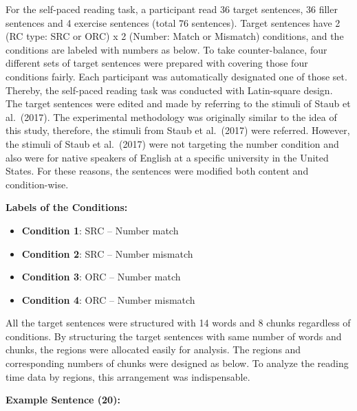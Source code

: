 \documentclass[
]{article}
\begin{document}
For the self-paced reading task, a participant read 36 target sentences,
36 filler sentences and 4 exercise sentences (total 76 sentences).
Target sentences have 2 (RC type: SRC or ORC) x 2 (Number: Match or
Mismatch) conditions, and the conditions are labeled with numbers as
below. To take counter-balance, four different sets of target sentences
were prepared with covering those four conditions fairly. Each
participant was automatically designated one of those set. Thereby, the
self-paced reading task was conducted with Latin-square design. The
target sentences were edited and made by referring to the stimuli of
Staub et al.~(2017). The experimental methodology was originally similar
to the idea of this study, therefore, the stimuli from Staub et
al.~(2017) were referred. However, the stimuli of Staub et al.~(2017)
were not targeting the number condition and also were for native
speakers of English at a specific university in the United States. For
these reasons, the sentences were modified both content and
condition-wise.

\vspace{1em}

\noindent \textbf{Labels of the Conditions:}

\vspace{0.5em}

\begin{itemize}
  \setlength\itemsep{0.5em}
  \item \textbf{Condition 1}: SRC -- Number match
  \item \textbf{Condition 2}: SRC -- Number mismatch
  \item \textbf{Condition 3}: ORC -- Number match
  \item \textbf{Condition 4}: ORC -- Number mismatch
\end{itemize}

\vspace{1em}

All the target sentences were structured with 14 words and 8 chunks
regardless of conditions. By structuring the target sentences with same
number of words and chunks, the regions were allocated easily for
analysis. The regions and corresponding numbers of chunks were designed
as below. To analyze the reading time data by regions, this arrangement
was indispensable.

\vspace{1em}

\noindent \textbf{Example Sentence (20):}

\vspace{0.5em}
\end{document}

